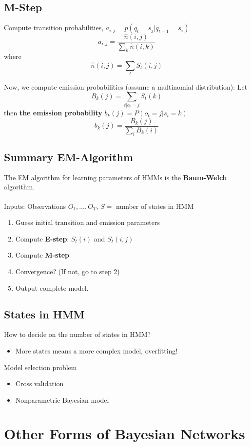 \documentclass[10pt]{article}
\begin{document}
\subsection*{M-Step}
Compute transition probabilities, $a_{i, j} = p(q_t = s_j | q_{t - 1} = s_i)$
\[a_{i, j} = \frac{\hat{n}(i, j)}{\sum_k \hat{n}(i, k)}\]
where
\[\hat{n}(i, j) = \sum_t S_t(i, j)\]

Now, we compute emission probabilities (assume a multinomial distribution):  Let
\[B_k(j) = \sum_{t | o_t = j} S_t(k)\]
then \textbf{the emission probability} $b_k(j) = P(o_t = j | s_i = k)$
\[b_k(j) = \frac{B_k(j)}{\sum_i B_k(i)}\]

\subsection*{Summary EM-Algorithm}
The EM algorithm for learning parameters of HMMs is the \textbf{Baum-Welch} algorithm.\\\\
Inputs: Observations $O_1, \dots, O_T$, $S = $ number of states in HMM
\begin{enumerate}
	\item Guess initial transition and emission parameters
	\item Compute \textbf{E-step}: $S_t(i)$ and $S_t(i, j)$
	\item Compute \textbf{M-step}
	\item Convergence?  (If not, go to step 2)
	\item Output complete model.
\end{enumerate}

\subsection*{States in HMM}
How to decide on the number of states in HMM?
\begin{itemize}
	\item More states means a more complex model, overfitting!
\end{itemize}
Model selection problem
\begin{itemize}
	\item Cross validation
	\item Nonparametric Bayesian model
\end{itemize}

\section*{Other Forms of Bayesian Networks}
\end{document}
